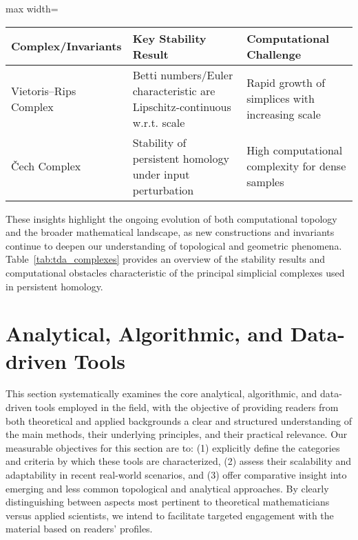 \documentclass[sigconf]{acmart}
\begin{document}
\begin{table*}[htbp]
\centering
\caption{Summary of Key Properties and Computational Challenges of Vietoris--Rips and Čech Complexes}
\label{tab:tda_complexes}
\begin{adjustbox}{max width=\textwidth}
\begin{tabular}{lll}
\toprule
\textbf{Complex/Invariants} & \textbf{Key Stability Result} & \textbf{Computational Challenge} \\
\midrule
Vietoris--Rips Complex      & Betti numbers/Euler characteristic are Lipschitz-continuous w.r.t. scale & Rapid growth of simplices with increasing scale \\
Čech Complex                & Stability of persistent homology under input perturbation & High computational complexity for dense samples \\
\bottomrule
\end{tabular}
\end{adjustbox}
\end{table*}

These insights highlight the ongoing evolution of both computational topology and the broader mathematical landscape, as new constructions and invariants continue to deepen our understanding of topological and geometric phenomena. Table~\ref{tab:tda_complexes} provides an overview of the stability results and computational obstacles characteristic of the principal simplicial complexes used in persistent homology.

\section{Analytical, Algorithmic, and Data-driven Tools}

This section systematically examines the core analytical, algorithmic, and data-driven tools employed in the field, with the objective of providing readers from both theoretical and applied backgrounds a clear and structured understanding of the main methods, their underlying principles, and their practical relevance. Our measurable objectives for this section are to: (1) explicitly define the categories and criteria by which these tools are characterized, (2) assess their scalability and adaptability in recent real-world scenarios, and (3) offer comparative insight into emerging and less common topological and analytical approaches. By clearly distinguishing between aspects most pertinent to theoretical mathematicians versus applied scientists, we intend to facilitate targeted engagement with the material based on readers' profiles.
\end{document}
